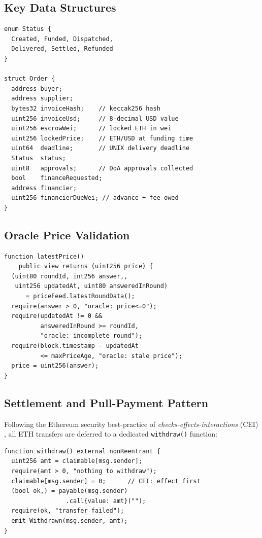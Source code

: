 \documentclass[conference]{IEEEtran}
\begin{document}
\subsection{Key Data Structures}

\begin{lstlisting}[caption={TracePay Order struct and state enum.},
                   label={lst:struct}]
enum Status {
  Created, Funded, Dispatched,
  Delivered, Settled, Refunded
}

struct Order {
  address buyer;
  address supplier;
  bytes32 invoiceHash;    // keccak256 hash
  uint256 invoiceUsd;     // 8-decimal USD value
  uint256 escrowWei;      // locked ETH in wei
  uint256 lockedPrice;    // ETH/USD at funding time
  uint64  deadline;       // UNIX delivery deadline
  Status  status;
  uint8   approvals;      // DoA approvals collected
  bool    financeRequested;
  address financier;
  uint256 financierDueWei; // advance + fee owed
}
\end{lstlisting}

\subsection{Oracle Price Validation}

\begin{lstlisting}[caption={Stale-price guard in \texttt{latestPrice()}.},
                   label={lst:oracle}]
function latestPrice()
    public view returns (uint256 price) {
  (uint80 roundId, int256 answer,,
   uint256 updatedAt, uint80 answeredInRound)
      = priceFeed.latestRoundData();
  require(answer > 0, "oracle: price<=0");
  require(updatedAt != 0 &&
          answeredInRound >= roundId,
          "oracle: incomplete round");
  require(block.timestamp - updatedAt
          <= maxPriceAge, "oracle: stale price");
  price = uint256(answer);
}
\end{lstlisting}

\subsection{Settlement and Pull-Payment Pattern}

Following the Ethereum security best-practice of
\emph{checks-effects-interactions} (CEI) \cite{solidity_patterns},
all ETH transfers are deferred to a dedicated \texttt{withdraw()}
function:

\begin{lstlisting}[caption={Pull-payment withdrawal.},
                   label={lst:withdraw}]
function withdraw() external nonReentrant {
  uint256 amt = claimable[msg.sender];
  require(amt > 0, "nothing to withdraw");
  claimable[msg.sender] = 0;      // CEI: effect first
  (bool ok,) = payable(msg.sender)
                 .call{value: amt}("");
  require(ok, "transfer failed");
  emit Withdrawn(msg.sender, amt);
}
\end{lstlisting}
\end{document}
